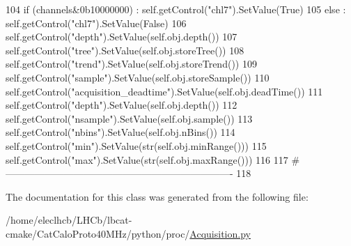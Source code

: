 \begin{DoxyCode}
104         \textcolor{keywordflow}{if} (channels&0b10000000) : self.getControl(\textcolor{stringliteral}{"chl7"}).SetValue(\textcolor{keyword}{True})
105         \textcolor{keywordflow}{else} : self.getControl(\textcolor{stringliteral}{"chl7"}).SetValue(\textcolor{keyword}{False})
106         self.getControl(\textcolor{stringliteral}{"depth"}).SetValue(self.obj.depth())
107         self.getControl(\textcolor{stringliteral}{"tree"}).SetValue(self.obj.storeTree())
108         self.getControl(\textcolor{stringliteral}{"trend"}).SetValue(self.obj.storeTrend())
109         self.getControl(\textcolor{stringliteral}{"sample"}).SetValue(self.obj.storeSample())
110         self.getControl(\textcolor{stringliteral}{"acquisition\_deadtime"}).SetValue(self.obj.deadTime())
111         self.getControl(\textcolor{stringliteral}{"depth"}).SetValue(self.obj.depth())
112         self.getControl(\textcolor{stringliteral}{"nsample"}).SetValue(self.obj.sample())
113         self.getControl(\textcolor{stringliteral}{"nbins"}).SetValue(self.obj.nBins())
114         self.getControl(\textcolor{stringliteral}{"min"}).SetValue(str(self.obj.minRange()))
115         self.getControl(\textcolor{stringliteral}{"max"}).SetValue(str(self.obj.maxRange()))
116          
117 \textcolor{comment}{#----------------------------------------------------------------------}
118 
\end{DoxyCode}


The documentation for this class was generated from the following file\+:\begin{DoxyCompactItemize}
\item 
/home/eleclhcb/\+L\+H\+Cb/lbcat-\/cmake/\+Cat\+Calo\+Proto40\+M\+Hz/python/proc/\hyperlink{Acquisition_8py}{Acquisition.\+py}\end{DoxyCompactItemize}
